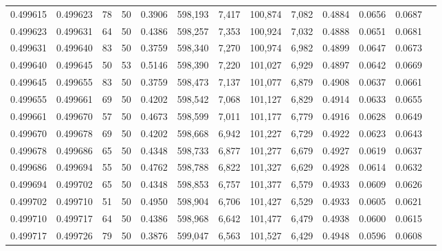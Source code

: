\begin{tabular}{rrrrrrrrrrrrr}
0.499615 & 0.499623 &    78 &  50 &                                     0.3906 & 598,193 &   7,417 & 100,874 &   7,082 & 0.4884 & 0.0656 & 0.0687 \\
0.499623 & 0.499631 &    64 &  50 &                                     0.4386 & 598,257 &   7,353 & 100,924 &   7,032 & 0.4888 & 0.0651 & 0.0681 \\
0.499631 & 0.499640 &    83 &  50 &                                     0.3759 & 598,340 &   7,270 & 100,974 &   6,982 & 0.4899 & 0.0647 & 0.0673 \\
0.499640 & 0.499645 &    50 &  53 &                                     0.5146 & 598,390 &   7,220 & 101,027 &   6,929 & 0.4897 & 0.0642 & 0.0669 \\
0.499645 & 0.499655 &    83 &  50 &                                     0.3759 & 598,473 &   7,137 & 101,077 &   6,879 & 0.4908 & 0.0637 & 0.0661 \\
0.499655 & 0.499661 &    69 &  50 &                                     0.4202 & 598,542 &   7,068 & 101,127 &   6,829 & 0.4914 & 0.0633 & 0.0655 \\
0.499661 & 0.499670 &    57 &  50 &                                     0.4673 & 598,599 &   7,011 & 101,177 &   6,779 & 0.4916 & 0.0628 & 0.0649 \\
0.499670 & 0.499678 &    69 &  50 &                                     0.4202 & 598,668 &   6,942 & 101,227 &   6,729 & 0.4922 & 0.0623 & 0.0643 \\
0.499678 & 0.499686 &    65 &  50 &                                     0.4348 & 598,733 &   6,877 & 101,277 &   6,679 & 0.4927 & 0.0619 & 0.0637 \\
0.499686 & 0.499694 &    55 &  50 &                                     0.4762 & 598,788 &   6,822 & 101,327 &   6,629 & 0.4928 & 0.0614 & 0.0632 \\
0.499694 & 0.499702 &    65 &  50 &                                     0.4348 & 598,853 &   6,757 & 101,377 &   6,579 & 0.4933 & 0.0609 & 0.0626 \\
0.499702 & 0.499710 &    51 &  50 &                                     0.4950 & 598,904 &   6,706 & 101,427 &   6,529 & 0.4933 & 0.0605 & 0.0621 \\
0.499710 & 0.499717 &    64 &  50 &                                     0.4386 & 598,968 &   6,642 & 101,477 &   6,479 & 0.4938 & 0.0600 & 0.0615 \\
0.499717 & 0.499726 &    79 &  50 &                                     0.3876 & 599,047 &   6,563 & 101,527 &   6,429 & 0.4948 & 0.0596 & 0.0608 \\

\end{tabular}
